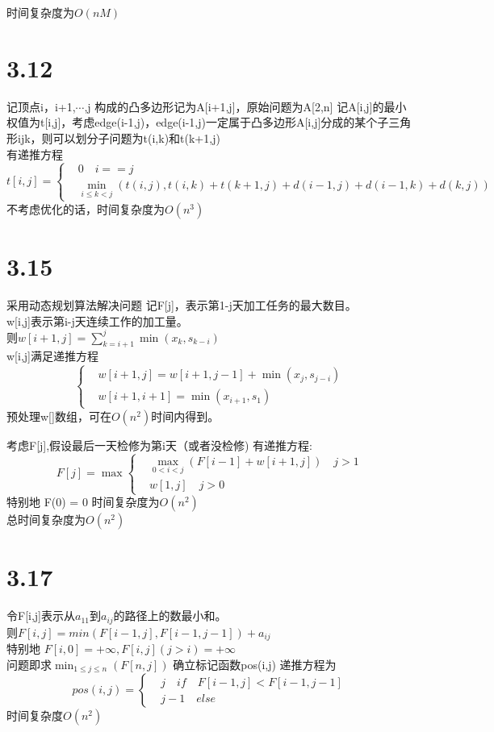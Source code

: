 \documentclass[a4paper]{article}
\begin{document}
时间复杂度为$O(nM)$
\section*{3.12}
记顶点i，i+1,$\cdots$,j 构成的凸多边形记为A[i+1,j]，原始问题为A[2,n]
记A[i,j]的最小权值为t[i,j]，考虑edge(i-1,j)，edge(i-1,j)一定属于凸多边形A[i,j]分成的某个子三角形ijk，则可以划分子问题为t(i,k)和t(k+1,j) \\
有递推方程
$$
t[i,j]=\left\{
\begin{aligned}
& 0 \quad i == j \\
& \min_{i\le k<j}(t(i,j),t(i,k)+t(k+1,j)+d(i-1,j)+d(i-1,k)+d(k,j))
\end{aligned}
\right.
$$
不考虑优化的话，时间复杂度为$O(n^3)$
\section*{3.15}
采用动态规划算法解决问题
记F[j]，表示第1-j天加工任务的最大数目。\\
w[i,j]表示第i-j天连续工作的加工量。\\
则$w[i+1,j]=\sum_{k=i+1}^j{\min(x_k,s_{k-i})}$\\
w[i,j]满足递推方程
$$
\left\{
\begin{aligned}
& w[i+1,j]=w[i+1,j-1]+\min(x_j,s_{j-i}) \\
& w[i+1,i+1] =\min(x_{i+1},s_1)
\end{aligned}
\right.
$$
预处理w[]数组，可在$O(n^2)$时间内得到。

考虑F[j],假设最后一天检修为第i天（或者没检修)
有递推方程:\\
$$
F[j]=\max \left\{
\begin{aligned}
& \max_{0<i<j} (F[i-1]+w[i+1,j]) \quad j > 1 \\
& w[1,j] \quad j > 0
\end{aligned}
\right.
$$
特别地 F(0) = 0
时间复杂度为$O(n^2)$ \\
总时间复杂度为$O(n^2)$
\section*{3.17}
令F[i,j]表示从$a_{11}到a_{ij}$的路径上的数最小和。\\
则$F[i,j]=min(F[i-1,j],F[i-1,j-1])+a_{ij}$\\
特别地 $F[i,0] = +\infty, F[i,j] (j > i) = + \infty$ \\
问题即求$\min_{1\le j \le n}(F[n,j])$
确立标记函数pos(i,j)
递推方程为
$$
pos(i,j) = \left\{
\begin{aligned}
& j \quad if \quad F[i-1,j] <F[i-1,j-1] \\
& j - 1 \quad else
\end{aligned}
\right.
$$ 
时间复杂度$O(n^2)$
\end{document}
